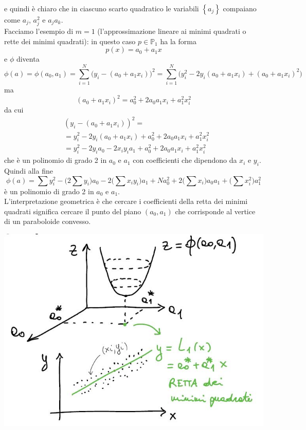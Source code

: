 e quindi è chiaro che in ciascuno scarto quadratico le variabili $\left\{ a_j \right\}$ compaiano come $a_j$, $a_j^2$ e $a_ja_k$. \\
Facciamo l'esempio di $m=1$ (l'approssimazione lineare ai minimi quadrati o rette dei minimi quadrati): in questo caso $p \in \mathbb{P}_1$ ha la forma 
\begin{equation*}
    p(x) = a_0 + a_1x
\end{equation*}
e $\phi$ diventa
\begin{equation*}
    \phi(a) = \phi(a_0, a_1) = \sum_{i=1}^N \biggl( y_i - (a_0+a_1x_i) \biggr) ^2 = \sum_{i=1}^N \biggl( y_i^2 - 2y_i(a_0+a_1x_i) + (a_0+a_1x_i)^2 \biggr)
\end{equation*}
ma 
\begin{equation*}
    (a_0+a_1x_i)^2 = a_0^2 + 2a_0a_1x_i + a_1^2x_i^2 
\end{equation*}
da cui
\begin{align*}
    & (y_i - (a_0+a_1x_i))^2 = \\
    & = y_i^2 - 2y_i(a_0+a_1x_i) + a_0^2 + 2a_0a_1x_i + a_1^2x_i^2 \\
    & = y_i^2 - 2y_ia_0 - 2x_iy_ia_1 + a_0^2 + 2a_0a_1x_i + a_1^2x_i^2
\end{align*}
che è un polinomio di grado 2 in $a_0$ e $a_1$ con coefficienti che dipendono da $x_i$ e $y_i$. \\
Quindi alla fine
\begin{equation*}
    \phi(a) = \sum y_i^2 - \biggl( 2\sum y_i \biggr) a_0 - 2\biggl( \sum x_iy_i \biggr)a_1 + Na_0^2 + 2\biggl( \sum x_i \biggr)a_0a_1 + \biggl( \sum x_i^2 \biggr)a_1^2
\end{equation*}
è un polinomio di grado 2 in $a_0$ e $a_1$.\\
L'interpretazione geometrica è che cercare i coefficienti della retta dei minimi quadrati significa cercare il punto del piano $(a_0,a_1)$ che corrisponde al vertice di un paraboloide convesso.
\begin{center}
    \includegraphics[scale=0.7]{foto/calcolo12}
\end{center}
